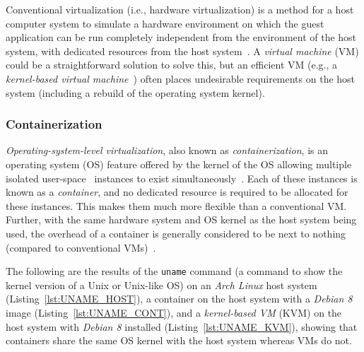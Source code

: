 \medskip

Conventional virtualization (i.e., hardware virtualization) is a method for a
host computer system to simulate a hardware environment on which the guest
application can be run completely independent from the environment of the host
system, with dedicated resources from the host system~\citep[Chapter 16]{os}.
A \emph{virtual machine} (VM) could be a straightforward solution to solve
this,
but an efficient VM
(e.g., a \emph{kernel-based virtual machine}~\cite{kvm}) 
often places undesirable requirements on the host system 
(including a rebuild of the operating system kernel).

\subsubsection{Containerization}
\emph{Operating-system-level virtualization}, also known as
\emph{containerization}, is an operating system (OS) feature offered by the
kernel of the OS allowing multiple isolated user-space~\citep[Section 1.5.1]{os}
instances to exist simultaneously~\cite{docker}.
Each of these instances is known as a \emph{container}, and no dedicated resource
is required to be allocated for these instances.
This makes them much more
flexible than a conventional VM.
Further, with the same hardware system and
OS kernel as the host system being used, the overhead of a container is
generally considered to be next to nothing (compared to conventional
VMs)~\cite{dockerVM}.

\pagebreak

The following are the results of the \texttt{uname} command
(a command to show the kernel version of a Unix or Unix-like OS)
on an \emph{Arch Linux} host system (Listing~\ref{lst:UNAME_HOST}),
a container on the host system with a \emph{Debian 8}~\cite{debian} image
(Listing~\ref{lst:UNAME_CONT}),
and a \emph{kernel-based VM} (KVM) on the host system with \emph{Debian 8}
installed (Listing~\ref{lst:UNAME_KVM}),
showing that containers share the same OS kernel with the host system whereas
VMs do not.


\begin{centering}



\end{centering}

